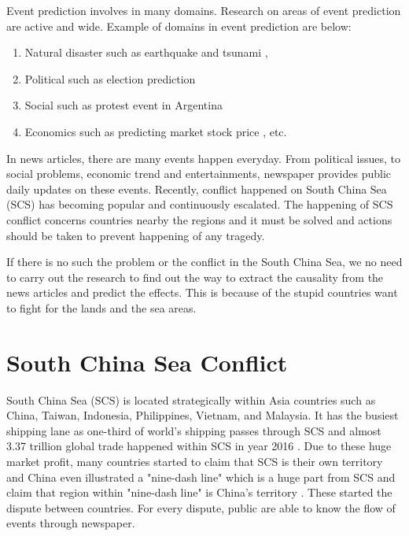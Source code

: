 \documentclass[twoside]{utmthesis}
\begin{document}
Event prediction involves in many domains. Research on areas of event prediction are active and wide. Example of domains in event prediction are below:
\begin{enumerate}
	\item Natural disaster such as earthquake \citep{asencio2017medium,asim2017earthquake} and tsunami \citep{mulia2016real},
	\item Political such as election prediction \citep{tung2016mining}
	\item Social such as protest event in Argentina  \citep{ning2016modeling}
	\item Economics such as predicting market stock price \citep{ding2015deep,vargas2017deep}, etc.  
\end{enumerate}

In news articles, there are many events happen everyday. From political issues, to social problems, economic trend and entertainments, newspaper provides public daily updates on these events. Recently, conflict happened on South China Sea (SCS) has becoming popular and continuously escalated. The happening of SCS conflict concerns countries nearby the regions and it must be solved and actions should be taken to prevent happening of any tragedy.     

If there is no such the problem or the conflict in the South China Sea, we no need to carry out the research to find out the way to extract the causality from the news articles and predict the effects. This is because of the stupid countries want to fight for the lands and the sea areas.

\section{South China Sea Conflict}
South China Sea (SCS) is located strategically within Asia countries such as China, Taiwan, Indonesia, Philippines, Vietnam, and Malaysia. It has the busiest shipping lane as one-third of world's shipping passes through SCS and almost 3.37 trillion global trade happened within SCS in year 2016  \citep{chinapower2016}. Due to these huge market profit, many countries started to claim that SCS is their own territory and China even illustrated a "nine-dash line" which is a huge part from SCS and claim that region within "nine-dash line" is China's territory \citep{liuzhen2014}. These started the dispute between countries. For every dispute, public are able to know the flow of events through newspaper.
\end{document}
